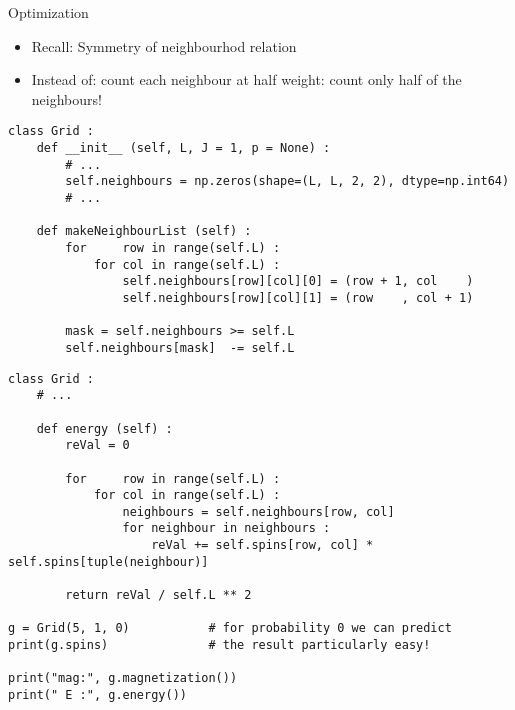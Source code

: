 
\begin{frame}[fragile]{Optimization}
%
\begin{itemize}
\item Recall: Symmetry of neighbourhod relation
\item Instead of: count each neighbour at half weight: count only half of the neighbours!
\end{itemize}
%
\vspace{-6pt}
\begin{codebox}
\begin{verbatim}
class Grid :
    def __init__ (self, L, J = 1, p = None) :
        # ...
        self.neighbours = np.zeros(shape=(L, L, 2, 2), dtype=np.int64)
        # ...
    
    def makeNeighbourList (self) :
        for     row in range(self.L) :
            for col in range(self.L) :
                self.neighbours[row][col][0] = (row + 1, col    )
                self.neighbours[row][col][1] = (row    , col + 1)
                
        mask = self.neighbours >= self.L
        self.neighbours[mask]  -= self.L
\end{verbatim}
\end{codebox}
%
\end{frame}


\begin{frame}[fragile]
%
\begin{codebox}
\begin{verbatim}
class Grid :
    # ...
    
    def energy (self) :
        reVal = 0
        
        for     row in range(self.L) :
            for col in range(self.L) :
                neighbours = self.neighbours[row, col]
                for neighbour in neighbours :
                    reVal += self.spins[row, col] * self.spins[tuple(neighbour)]
        
        return reVal / self.L ** 2

g = Grid(5, 1, 0)           # for probability 0 we can predict
print(g.spins)              # the result particularly easy!

print("mag:", g.magnetization())
print(" E :", g.energy())
\end{verbatim}
\end{codebox}
%
\end{frame}


